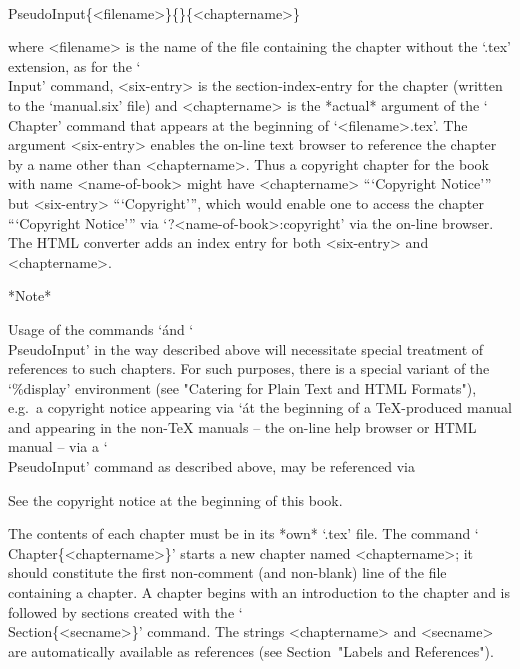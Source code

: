 \)\\PseudoInput\{<filename>\}\{<six-entry>\}\{<chaptername>\}

\item{}
where <filename> is the name of the file containing the  chapter  without
the `.tex' extension, as for the `\\Input' command,  <six-entry>  is  the
section-index-entry for the chapter (written to  the  `manual.six'  file)
and <chaptername> is the *actual* argument  of  the  `\\Chapter'  command
that  appears  at  the  beginning  of  `<filename>.tex'.   The   argument
<six-entry> enables the on-line text browser to reference the chapter  by
a name other than <chaptername>. Thus a copyright chapter  for  the  book
with name <name-of-book> might have <chaptername> ```Copyright  Notice'''
but <six-entry> ```Copyright''', which would enable  one  to  access  the
chapter ```Copyright Notice''' via  `?<name-of-book>:copyright'  via  the
on-line browser.  The  HTML  converter  adds  an  index  entry  for  both
<six-entry> and <chaptername>.

\endlist

*Note*

Usage of the commands `\' and `\\PseudoInput' in the way  described
above will necessitate special treatment of references to such  chapters.
For such  purposes,  there  is  a  special  variant  of  the  `\%display'
environment (see "Catering for Plain  Text  and  HTML  Formats"),  e.g.~a
copyright  notice  appearing  via  `\'  at  the  beginning   of   a
{\TeX}-produced manual and appearing in the  non-{\TeX}  manuals  --  the
on-line help browser or HTML manual -- via a `\\PseudoInput'  command  as
described above, may be referenced via

\begintt
See the copyright notice at the beginning of this book.
\endtt


\indextt{\\Chapter}\indextt{\\Section}
The contents of each chapter must  be  in  its  *own*  `.tex'  file.  The
command  `\\Chapter\{<chaptername>\}'  starts   a   new   chapter   named
<chaptername>; it should constitute the first non-comment (and non-blank)
line of  the  file  containing  a  chapter.  A  chapter  begins  with  an
introduction to the chapter and is followed by sections created with  the
`\\Section\{<secname>\}' command. The strings <chaptername> and <secname>
are  automatically  available  as  references  (see  Section~"Labels  and
References").

